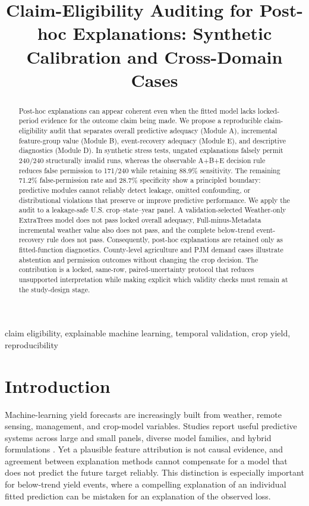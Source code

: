 \documentclass[conference]{IEEEtran}
\title{Claim-Eligibility Auditing for Post-hoc Explanations: Synthetic Calibration and Cross-Domain Cases}
\author{\IEEEauthorblockN{Anonymous Submission}}
\begin{document}
\maketitle

\begin{abstract}
Post-hoc explanations can appear coherent even when the fitted model lacks
locked-period evidence for the outcome claim being made. We propose a
reproducible claim-eligibility audit that separates overall predictive adequacy
(Module A), incremental feature-group value (Module B), event-recovery adequacy
(Module E), and descriptive diagnostics (Module D). In synthetic stress tests,
ungated explanations falsely permit 240/240 structurally invalid runs, whereas
the observable A+B+E decision rule reduces false permission to 171/240 while
retaining 88.9\% sensitivity. The remaining 71.2\% false-permission rate and
28.7\% specificity show a principled boundary: predictive modules cannot
reliably detect leakage, omitted confounding, or distributional violations that
preserve or improve predictive performance. We apply the audit to a leakage-safe
U.S. crop--state--year panel. A validation-selected Weather-only ExtraTrees
model does not pass locked overall adequacy, Full-minus-Metadata incremental
weather value also does not pass, and the complete below-trend event-recovery
rule does not pass. Consequently, post-hoc explanations are retained only as
fitted-function diagnostics. County-level agriculture and PJM demand cases
illustrate abstention and permission outcomes without changing the crop
decision. The contribution is a locked, same-row, paired-uncertainty protocol
that reduces unsupported interpretation while making explicit which validity
checks must remain at the study-design stage.
\end{abstract}

\begin{IEEEkeywords}
claim eligibility, explainable machine learning, temporal validation, crop yield,
reproducibility
\end{IEEEkeywords}

\section{Introduction}
Machine-learning yield forecasts are increasingly built from weather, remote
sensing, management, and crop-model variables. Studies report useful predictive
systems across large and small panels, diverse model families, and hybrid
formulations \cite{Paudel2021,Meroni2021,LengHall2020,Klompenburg2020}.
Yet a plausible feature attribution is not causal evidence, and agreement between
explanation methods cannot compensate for a model that does not predict the future
target reliably. This distinction is especially important for below-trend yield
events, where a compelling explanation of an individual fitted prediction can be
mistaken for an explanation of the observed loss.
\end{document}
